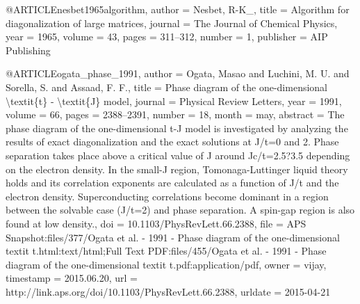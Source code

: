 @ARTICLE{nesbet1965algorithm,
  author = {Nesbet, R-K\_},
  title = {Algorithm for diagonalization of large matrices},
  journal = {The Journal of Chemical Physics},
  year = {1965},
  volume = {43},
  pages = {311--312},
  number = {1},
  publisher = {AIP Publishing}
}

@ARTICLE{ogata_phase_1991,
  author = {Ogata, Masao and Luchini, M. U. and Sorella, S. and Assaad, F. F.},
  title = {Phase diagram of the one-dimensional {\textbackslash}textit\{t\}
	- {\textbackslash}textit\{{J}\} model},
  journal = {Physical Review Letters},
  year = {1991},
  volume = {66},
  pages = {2388--2391},
  number = {18},
  month = may,
  abstract = {The phase diagram of the one-dimensional t-J model is investigated
	by analyzing the results of exact diagonalization and the exact solutions
	at J/t=0 and 2. Phase separation takes place above a critical value
	of J around Jc/t=2.5?3.5 depending on the electron density. In the
	small-J region, Tomonaga-Luttinger liquid theory holds and its correlation
	exponents are calculated as a function of J/t and the electron density.
	Superconducting correlations become dominant in a region between
	the solvable case (J/t=2) and phase separation. A spin-gap region
	is also found at low density.},
  doi = {10.1103/PhysRevLett.66.2388},
  file = {APS Snapshot:files/377/Ogata et al. - 1991 - Phase diagram of the one-dimensional     textit t.html:text/html;Full Text PDF:files/455/Ogata et al. - 1991 - Phase diagram of the one-dimensional     textit t.pdf:application/pdf},
  owner = {vijay},
  timestamp = {2015.06.20},
  url = {http://link.aps.org/doi/10.1103/PhysRevLett.66.2388},
  urldate = {2015-04-21}
}

